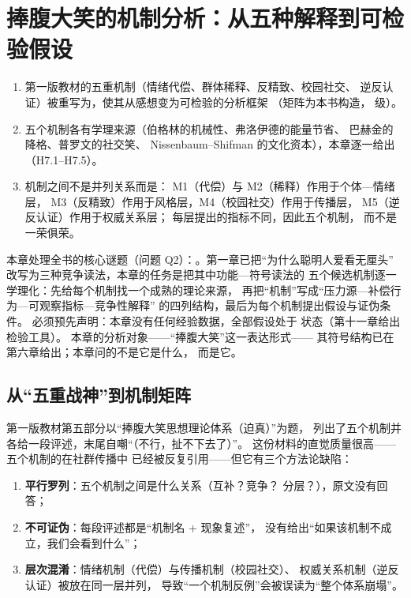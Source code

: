 \chapter{捧腹大笑的机制分析：从五种解释到可检验假设}\label{ch:07}

\begin{nlkeypoints}
  \begin{enumerate}[label=(\arabic*),leftmargin=2.4em]
    \item 第一版教材的五重机制（情绪代偿、群体稀释、反精致、校园社交、
          逆反认证）被重写为，使其从感想变为可检验的分析框架
          （矩阵为本书构造， 级）。
    \item 五个机制各有学理来源（伯格林的机械性、弗洛伊德的能量节省、
          巴赫金的降格、普罗文的社交笑、
          Nissenbaum--Shifman 的文化资本），本章逐一给出
          （H7.1--H7.5）。
    \item 机制之间不是并列关系而是：
          M1（代偿）与 M2（稀释）作用于个体—情绪层，
          M3（反精致）作用于风格层，M4（校园社交）作用于传播层，
          M5（逆反认证）作用于权威关系层；
          每层提出的指标不同，因此五个机制，
          而不是一荣俱荣。
  \end{enumerate}
\end{nlkeypoints}

本章处理全书的核心谜题（问题 Q2）：。第一章已把“为什么聪明人爱看无厘头”
改写为三种竞争读法，本章的任务是把其中功能—符号读法的
五个候选机制逐一学理化：先给每个机制找一个成熟的理论来源，
再把“机制”写成“压力源—补偿行为—可观察指标—竞争性解释”
的四列结构，最后为每个机制提出假设与证伪条件。
必须预先声明：本章没有任何经验数据，全部假设处于
状态（第十一章给出检验工具）。
本章的分析对象——“捧腹大笑”这一表达形式——
其符号结构已在第六章给出；本章问的不是它是什么，
而是它。

\section{从“五重战神”到机制矩阵}\label{sec:07:matrix}

第一版教材第五部分以“捧腹大笑思想理论体系（迫真）”为题，
列出了五个机制并各给一段评述，末尾自嘲“（不行，扯不下去了）”。
这份材料的直觉质量很高——五个机制的在社群传播中
已经被反复引用——但它有三个方法论缺陷：

\begin{enumerate}[label=\arabic*.]
  \item \textbf{平行罗列}：五个机制之间是什么关系（互补？竞争？
        分层？），原文没有回答；
  \item \textbf{不可证伪}：每段评述都是“机制名 + 现象复述”，
        没有给出“如果该机制不成立，我们会看到什么”；
  \item \textbf{层次混淆}：情绪机制（代偿）与传播机制（校园社交）、
        权威关系机制（逆反认证）被放在同一层并列，
        导致“一个机制反例”会被误读为“整个体系崩塌”。
\end{enumerate}

